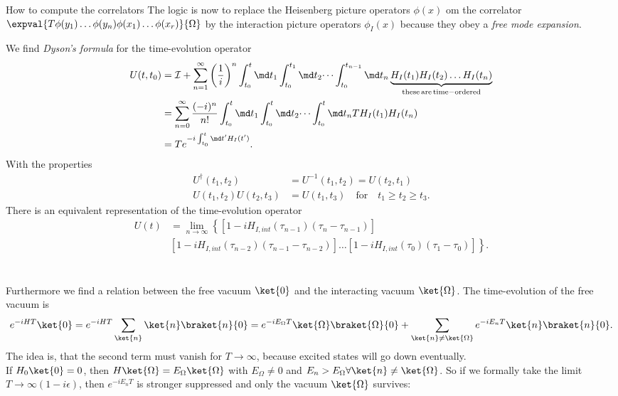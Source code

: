 \begin{mybox}{How to compute the correlators}
	The logic is now to replace the Heisenberg picture operators $\phi(x)$ om the correlator $\expval{T\phi(y_1) \dots \phi(y_n) \phi(x_1) \dots \phi(x_r)}{\Omega}$ by the interaction picture operators $\phi_I(x)$ because they obey a \emph{free mode expansion}.\\
\end{mybox}
We find \emph{Dyson's formula} for the time-evolution operator
\begin{align}
	U(t,t_0) &= \mathcal{I} + \sum_{n=1}^{\infty} \left(\frac{1}{i}\right)^n \int_{t_0}^{t} \md t_1 \int_{t_0}^{t_1} \md t_2 \dots \int_{t_0}^{t_{n-1}} \md t_n \underbrace{H_I(t_1)H_I(t_2)\dots H_I(t_n)}_{\mathrm{these \, are\, time-ordered}}\\
	&= \sum_{n=0}^{\infty} \frac{(-i)^n}{n!} \int_{t_0}^{t}\md t_1 \int_{t_0}^{t} \md t_2 \dots \int_{t_0}^{t} \md t_n T H_I (t_1)H_I(t_n) \\
	&=T e^{-i \int_{t_0}^{t} \md t'H_I(t')}.
\end{align}
With the properties
\begin{align}
	U^{\dagger}(t_1,t_2) &=U^{-1}(t_1,t_2) = U(t_2,t_1) \\
	U(t_1,t_2)U(t_2,t_3) &= U(t_1,t_3) \quad \mathrm{for} \quad t_1 \geq t_2 \geq t_3.
\end{align}
There is an equivalent representation of the time-evolution operator
\begin{align}
	U(t) &= \lim_{n\rightarrow \infty} \left\{  \left[1-i H_{I,int} (\tau_{n-1}) (\tau_n - \tau_{n-1})\right] \right. \\
	&\left.\left[1-i H_{I,int}(\tau_{n-2}) (\tau_{n-1}-\tau_{n-2}) \right]\dots \left[1-iH_{I, int} (\tau_0) (\tau_1-\tau_0) \right]   \right\}.
\end{align}
\\
\\
Furthermore we find a relation between the free vacuum $\ket{0}$ and the interacting vacuum $\ket{\Omega}$. The time-evolution of the free vacuum is
\begin{equation}
	e^{-iHT} \ket{0} = e^{-iHT} \sum_{\ket{n}} \ket{n} \braket{n}{0} = e^{- iE_{\Omega}T} \ket{\Omega}\braket{\Omega}{0}+\sum_{\ket{n} \neq \ket{\Omega}} e^{-iE_n T}\ket{n}\braket{n}{0}.
\end{equation}
The idea is, that the second term must vanish for $T\rightarrow \infty$, because excited states will go down eventually.\\
If $H_0 \ket{0}=0$, then $H\ket{\Omega} =E_{\Omega}\ket{\Omega}$ with $E_{\Omega}\neq 0$ and $E_n > E_{\Omega} \forall \ket{n} \neq \ket{\Omega}$. So if we formally take the limit $T\rightarrow\infty(1-i\epsilon)$, then $e^{-i E_n T}$ is stronger suppressed and only the vacuum $\ket{\Omega}$ survives:
